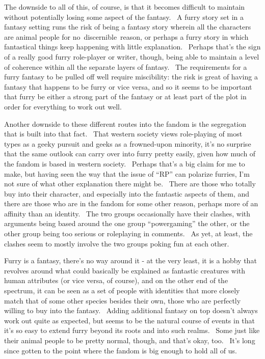 The downside to all of this, of course, is that it becomes difficult to
maintain without potentially losing some aspect of the fantasy. ~A furry
story set in a fantasy setting runs the risk of being a fantasy story
wherein all the characters are animal people for no~discernible~reason,
or perhaps a furry story in which fantastical things keep happening with
little explanation. ~Perhaps that's the sign of a really good furry
role-player or writer, though, being able to maintain a level of
coherence within all the separate layers of fantasy. ~The requirements
for a furry fantasy to be pulled off well require miscibility: the risk
is great of having a fantasy that happens to be furry or vice versa, and
so it seems to be important that furry be either a strong part of the
fantasy or at least part of the plot in order for everything to work out
well.

Another downside to these different routes into the fandom is the
segregation that is built into that fact. ~That western society views
role-playing of most types as a geeky pursuit and geeks as a
frowned-upon minority, it's no surprise that the same outlook can carry
over into furry pretty easily, given how much of the fandom is based in
western society. ~Perhaps that's a big claim for me to make, but having
seen the way that the issue of ``RP'' can polarize furries, I'm not sure
of what other explanation there might be. ~There are those who totally
buy into their character, and especially into the fantastic aspects of
them, and there are those who are in the fandom for some other reason,
perhaps more of an affinity than an identity. ~The two groups
occasionally have their clashes, with arguments being based around the
one group ``powergaming'' the other, or the other group being too
serious or roleplaying in comments. ~As yet, at least, the clashes seem
to mostly involve the two groups poking fun at each other.

Furry is a fantasy, there's no way around it - at the very least, it is
a hobby that revolves around what could basically be explained as
fantastic creatures with human attributes (or vice versa, of course),
and on the other end of the spectrum, it can be seen as a set of people
with identities that more closely match that of some other species
besides their own, those who are perfectly willing to buy into the
fantasy. ~Adding additional fantasy on top doesn't always work out quite
as expected, but seems to be the natural course of events in that it's
so easy to extend furry beyond its roots and into such realms. ~Some
just like their animal people to be pretty normal, though, and that's
okay, too. ~It's long since gotten to the point where the fandom is big
enough to hold all of us.
